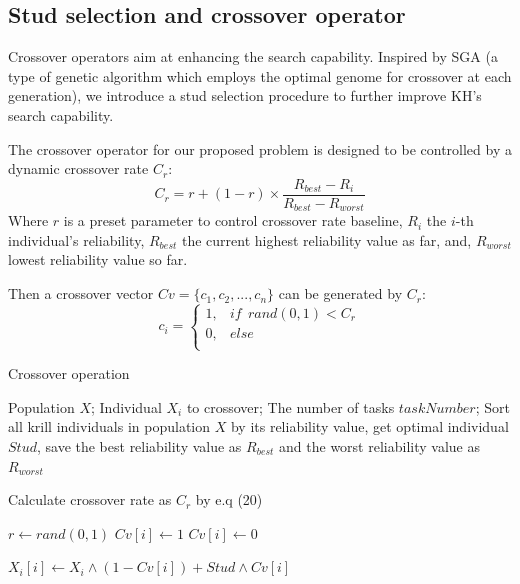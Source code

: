 \documentclass[journal]{IEEEtran}
\begin{document}
\subsection{Stud selection and crossover operator}

Crossover operators aim at enhancing the search capability. Inspired by SGA \cite{wang2014stud} (a type of genetic algorithm which employs the optimal genome for crossover at each generation), we introduce a stud selection procedure to further improve KH's search capability.

The crossover operator for our proposed problem is designed to be controlled by a dynamic crossover rate $C_{r}$:
\begin{equation}
C_{r} = r + (1-r) \times \frac{R_{best}-R_{i}}{R_{best}-R_{worst}}
\end{equation}
Where $r$ is a preset parameter to control crossover rate baseline, $R_{i}$ the $i$-th individual's reliability, $R_{best}$ the current highest reliability value as far, and, $R_{worst}$ lowest reliability value so far.

Then a crossover vector $Cv = \{c_{1},c_{2},...,c_{n}\}$ can be generated by $C_{r}$:
\begin{equation}
c_{i}=
\begin{cases}
1,& if \ \ rand(0,1) < C_{r}\\
0,& else\\
\end{cases}
\end{equation}

\begin{algorithm}
\caption{Crossover operation}
\label{alg1}
\begin{algorithmic}[1]

\REQUIRE Population $X$; Individual $X_i$ to crossover; The number of tasks $taskNumber$; 
\STATE Sort all krill individuals in population $X$ by its reliability value, get optimal individual $Stud$, save the best reliability value as $R_{best}$ and the worst reliability value as $R_{worst}$

\STATE Calculate crossover rate as $C_{r}$ by e.q (20)

\STATE $r \leftarrow rand(0,1)$
\STATE $Cv[i] \leftarrow 1$
\ELSE
\STATE $Cv[i] \leftarrow 0$
\ENDIF
\ENDFOR

\STATE $X_i[i] \leftarrow X_i \wedge  (1-Cv[i]) + Stud \wedge Cv[i]$ 
\ENDFOR
\end{algorithmic}
\end{algorithm}
\end{document}
